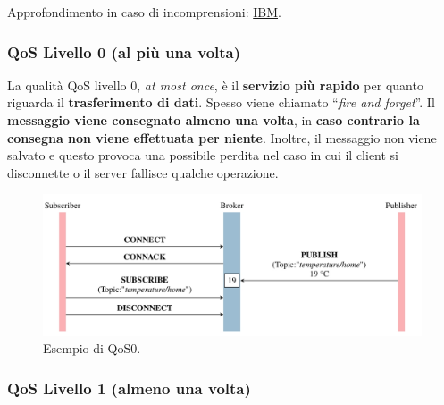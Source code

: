 \documentclass[a4paper]{article}
\newcommand{\dquotes}[1]{``#1''}
\begin{document}
	\noindent
	Approfondimento in caso di incomprensioni: \href{https://www.ibm.com/docs/en/mapms/1_cloud?topic=reference-mqtt-messaging}{IBM}.\newpage
	
	\subsubsection{QoS Livello 0 (al più una volta)}
	
	La qualità QoS livello 0, \emph{at most once}, è il \textbf{servizio più rapido} per quanto riguarda il \textbf{trasferimento di dati}. Spesso viene chiamato \dquotes{\emph{fire and forget}}. Il \textbf{messaggio viene consegnato almeno una volta}, in \textbf{caso contrario la consegna non viene effettuata per niente}. Inoltre, il messaggio non viene salvato e questo provoca una possibile perdita nel caso in cui il client si disconnette o il server fallisce qualche operazione.
	\begin{figure}[!htp]
		\centering
		\includegraphics[width=\textwidth]{img/pub-sub/QoS0.jpg}
		\caption{Esempio di QoS0.}
	\end{figure}\newpage
	
	\subsubsection{QoS Livello 1 (almeno una volta)}
	
\end{document}
